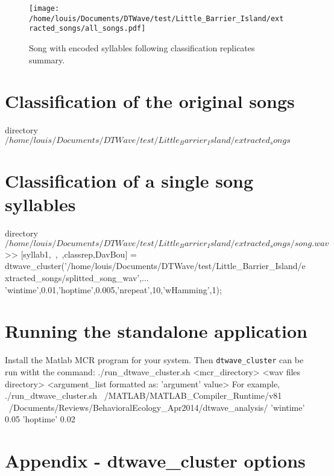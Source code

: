 \documentclass[a4paper]{article}
\begin{document}
\begin{figure}[h!]
\begin{center}
\texttt{[image: /home/louis/Documents/DTWave/test/Little\_Barrier\_Island/extracted\_songs/all\_songs.pdf]}
\vspace{1cm}
\caption{Song with encoded syllables following classification replicates summary.}
\end{center}
\label{fig:songs2}
\end{figure}


\clearpage
\section{Classification of the original songs}
directory \(/home/louis/Documents/DTWave/test/Little_Barrier_Island/extracted_songs\)


\clearpage
\section{Classification of a single song syllables}
directory \(/home/louis/Documents/DTWave/test/Little_Barrier_Island/extracted_songs/song.wav\)
>> [syllab1,~,~,classrep,DavBou] = dtwave_cluster('/home/louis/Documents/DTWave/test/Little_Barrier_Island/extracted_songs/splitted_song_wav',...
'wintime',0.01,'hoptime',0.005,'nrepeat',10,'wHamming',1);



\clearpage
\section{Running the standalone application}
Install the Matlab MCR program for your system.
Then \texttt{dtwave\_cluster} can be run witht the command:
./run_dtwave_cluster.sh <mcr_directory> <wav files directory> <argument_list formatted as: 'argument' value>
For example, \\
./run_dtwave_cluster.sh ~/MATLAB/MATLAB_Compiler_Runtime/v81 ~/Documents/Reviews/BehavioralEcology_Apr2014/dtwave_analysis/ 'wintime' 0.05 'hoptime' 0.02

\clearpage
\section{Appendix - dtwave\_cluster options}
\end{document}

